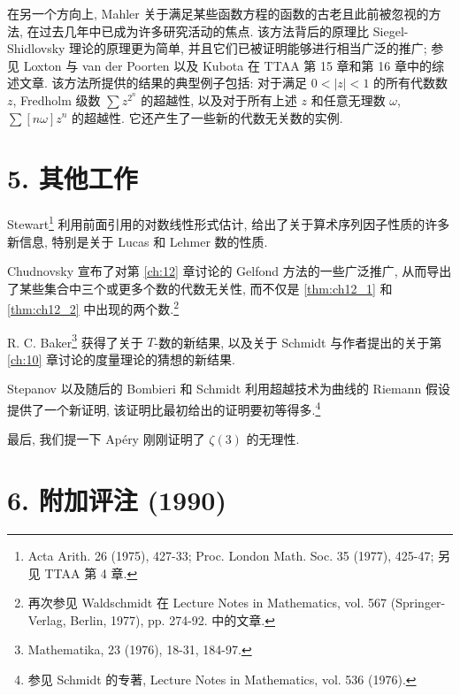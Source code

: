 在另一个方向上, Mahler 关于满足某些函数方程的函数的古老且此前被忽视的方法, 在过去几年中已成为许多研究活动的焦点. 该方法背后的原理比 Siegel-Shidlovsky 理论的原理更为简单, 并且它们已被证明能够进行相当广泛的推广; 参见 Loxton 与 van der Poorten 以及 Kubota 在 TTAA 第 15 章和第 16 章中的综述文章. 该方法所提供的结果的典型例子包括: 对于满足 \(0 < |z| < 1\) 的所有代数数 \(z\), Fredholm 级数 \(\sum z^{2^n}\) 的超越性, 以及对于所有上述 \(z\) 和任意无理数 \(\omega\), \(\sum [n\omega]z^n\) 的超越性. 它还产生了一些新的代数无关数的实例.

\section*{5. 其他工作}

Stewart\footnote{Acta Arith. 26 (1975), 427-33; Proc. London Math. Soc. 35 (1977), 425-47; 另见 TTAA 第 4 章.} 利用前面引用的对数线性形式估计, 给出了关于算术序列因子性质的许多新信息, 特别是关于 Lucas 和 Lehmer 数的性质.

Chudnovsky 宣布了对第 \autoref{ch:12} 章讨论的 Gelfond 方法的一些广泛推广, 从而导出了某些集合中三个或更多个数的代数无关性, 而不仅是 \autoref{thm:ch12_1} 和 \autoref{thm:ch12_2} 中出现的两个数.\footnote{再次参见 Waldschmidt 在 Lecture Notes in Mathematics, vol. 567 (Springer-Verlag, Berlin, 1977), pp. 274-92. 中的文章.}

R. C. Baker\footnote{Mathematika, 23 (1976), 18-31, 184-97.} 获得了关于 \(T\)-数的新结果, 以及关于 Schmidt 与作者提出的关于第 \autoref{ch:10} 章讨论的度量理论的猜想的新结果.

Stepanov 以及随后的 Bombieri 和 Schmidt 利用超越技术为曲线的 Riemann 假设提供了一个新证明, 该证明比最初给出的证明要初等得多.\footnote{参见 Schmidt 的专著, Lecture Notes in Mathematics, vol. 536 (1976).}

最后, 我们提一下 Ap{\'e}ry 刚刚证明了 \(\zeta(3)\) 的无理性.

\section*{6. 附加评注 (1990)}

